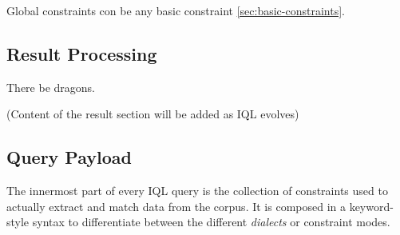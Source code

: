 \documentclass[11pt]{article}
\begin{document}
Global constraints con be any basic constraint \cref{sec:basic-constraints}.


\subsection{Result Processing}
\label{sec:result-processing}

There be dragons.

(Content of the result section will be added as IQL evolves)


\subsection{Query Payload}
\label{sec:query-payload}

The innermost part of every IQL query is the collection of constraints used to actually extract and match data from the corpus.
It is composed in a keyword-style syntax to differentiate between the different \textit{dialects} or constraint modes.
\end{document}
